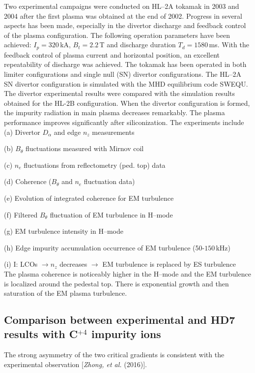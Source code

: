 \documentclass[a4paper,openany,12pt]{book}
\begin{document}
{Two experimental campaigns were conducted on HL--2A tokamak in 2003 and 2004 after the first plasma was obtained at the end of 2002. Progress in several aspects has been made, especially in the divertor discharge and feedback control of the plasma configuration. The following operation parameters have been achieved: $I_p = 320\,$kA, $B_t = 2.2\,$T and discharge duration $T_d = 1580\,$ms. With the feedback control of plasma current and horizontal position, an excellent repeatability of discharge was achieved. The tokamak has been operated in both limiter configurations and single null (SN) divertor configurations. The HL--2A SN divertor configuration is simulated with the MHD equilibrium code SWEQU. The divertor experimental results were compared with the simulation results obtained for the HL-2B configuration. When the divertor configuration is formed, the impurity radiation in main plasma decreases remarkably. The plasma
performance improves significantly after siliconization. The experiments include \\

(a) Divertor $D_\alpha$ and edge $n_z$ measurements

(b) $B_\theta$ fluctuations measured with Mirnov coil

(c) $n_e$ fluctuations from reflectometry (ped. top) data

(d) Coherence ($B_\theta$ and $n_e$ fluctuation data)

(e) Evolution of integrated coherence for EM turbulence

(f) Filtered $B_\theta$ fluctuation of EM turbulence in H--mode

(g) EM turbulence intensity in H--mode

(h) Edge impurity accumulation occurrence of EM turbulence (50-$150\,$kHz)

(i) I: LCOs $\to n_z$ decreases $\to$ EM turbulence is replaced by ES turbulence\\

The plasma coherence is noticeably higher in the H--mode and the EM turbulence is localized around the pedestal top. There is exponential growth and then saturation of the EM plasma turbulence.

\subsection{Comparison between experimental and HD7 results with C$^{+4}$ impurity ions}

The strong asymmetry of the two critical gradients is consistent with the experimental observation [\emph{Zhong, et al.} (2016)].

}
\end{document}

